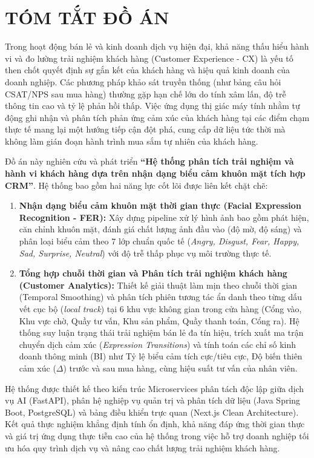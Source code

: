 \section*{TÓM TẮT ĐỒ ÁN}

Trong hoạt động bán lẻ và kinh doanh dịch vụ hiện đại, khả năng thấu hiểu hành vi và đo lường trải nghiệm khách hàng (Customer Experience - CX) là yếu tố then chốt quyết định sự gắn kết của khách hàng và hiệu quả kinh doanh của doanh nghiệp. Các phương pháp khảo sát truyền thống (như bảng câu hỏi CSAT/NPS sau mua hàng) thường gặp hạn chế lớn do tính xâm lấn, độ trễ thông tin cao và tỷ lệ phản hồi thấp. Việc ứng dụng thị giác máy tính nhằm tự động ghi nhận và phân tích phản ứng cảm xúc của khách hàng tại các điểm chạm thực tế mang lại một hướng tiếp cận đột phá, cung cấp dữ liệu tức thời mà không làm gián đoạn hành trình mua sắm tự nhiên của khách hàng.

Đồ án này nghiên cứu và phát triển \textbf{``Hệ thống phân tích trải nghiệm và hành vi khách hàng dựa trên nhận dạng biểu cảm khuôn mặt tích hợp CRM''}. Hệ thống bao gồm hai năng lực cốt lõi được liên kết chặt chẽ:
\begin{enumerate}
    \item \textbf{Nhận dạng biểu cảm khuôn mặt thời gian thực (Facial Expression Recognition - FER):} Xây dựng pipeline xử lý hình ảnh bao gồm phát hiện, căn chỉnh khuôn mặt, đánh giá chất lượng ảnh đầu vào (độ mờ, độ sáng) và phân loại biểu cảm theo 7 lớp chuẩn quốc tế (\textit{Angry, Disgust, Fear, Happy, Sad, Surprise, Neutral}) với độ trễ thấp phục vụ môi trường thực tế.
    \item \textbf{Tổng hợp chuỗi thời gian và Phân tích trải nghiệm khách hàng (Customer Analytics):} Thiết kế giải thuật làm mịn theo chuỗi thời gian (Temporal Smoothing) và phân tích phiên tương tác ẩn danh theo từng dấu vết cục bộ (\textit{local track}) tại 6 khu vực không gian trong cửa hàng (Cổng vào, Khu vực chờ, Quầy tư vấn, Khu sản phẩm, Quầy thanh toán, Cổng ra). Hệ thống suy luận trạng thái trải nghiệm bán lẻ đa tín hiệu, trích xuất ma trận chuyển dịch cảm xúc (\textit{Expression Transitions}) và tính toán các chỉ số kinh doanh thông minh (BI) như Tỷ lệ biểu cảm tích cực/tiêu cực, Độ biến thiên cảm xúc ($\Delta$) trước và sau mua hàng, cùng hiệu suất tư vấn của nhân viên.
\end{enumerate}

Hệ thống được thiết kế theo kiến trúc Microservices phân tách độc lập giữa dịch vụ AI (FastAPI), phân hệ nghiệp vụ quản trị và phân tích dữ liệu (Java Spring Boot, PostgreSQL) và bảng điều khiển trực quan (Next.js Clean Architecture). Kết quả thực nghiệm khẳng định tính ổn định, khả năng đáp ứng thời gian thực và giá trị ứng dụng thực tiễn cao của hệ thống trong việc hỗ trợ doanh nghiệp tối ưu hóa quy trình dịch vụ và nâng cao chất lượng trải nghiệm khách hàng.

\newpage
\cleardoublepage